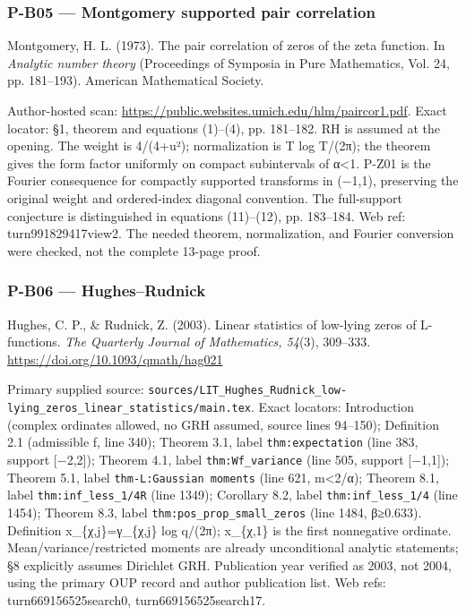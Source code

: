 \documentclass[11pt,a4paper]{article}
\theoremstyle{definition}\newtheorem{definition}{Definition}
\begin{document}
\subsubsection{P-B05 --- Montgomery supported pair
correlation}\label{p-b05--montgomery-supported-pair-correlation}

Montgomery, H. L. (1973). The pair correlation of zeros of the zeta
function. In \emph{Analytic number theory} (Proceedings of Symposia in
Pure Mathematics, Vol. 24, pp. 181--193). American Mathematical Society.

Author-hosted scan:
\url{https://public.websites.umich.edu/hlm/paircor1.pdf}. Exact locator:
§1, theorem and equations (1)--(4), pp. 181--182. RH is assumed at the
opening. The weight is 4/(4+u²); normalization is T log T/(2π); the
theorem gives the form factor uniformly on compact subintervals of
\textbar α\textbar\textless1. P-Z01 is the Fourier consequence for
compactly supported transforms in (−1,1), preserving the original weight
and ordered-index diagonal convention. The full-support conjecture is
distinguished in equations (11)--(12), pp. 183--184. Web ref:
turn991829417view2. The needed theorem, normalization, and Fourier
conversion were checked, not the complete 13-page proof.

\subsubsection{P-B06 --- Hughes--Rudnick}\label{p-b06--hughesrudnick}

Hughes, C. P., \& Rudnick, Z. (2003). Linear statistics of low-lying
zeros of L-functions. \emph{The Quarterly Journal of Mathematics,
54}(3), 309--333. \url{https://doi.org/10.1093/qmath/hag021}

Primary supplied source:
\texttt{sources/LIT\_Hughes\_Rudnick\_low-lying\_zeros\_linear\_statistics/main.tex}.
Exact locators: Introduction (complex ordinates allowed, no GRH assumed,
source lines 94--150); Definition 2.1 (admissible f, line 340); Theorem
3.1, label \texttt{thm:expectation} (line 383, support {[}−2,2{]});
Theorem 4.1, label \texttt{thm:Wf\_variance} (line 505, support
{[}−1,1{]}); Theorem 5.1, label \texttt{thm-L:Gaussian\ moments} (line
621, m\textless2/α); Theorem 8.1, label \texttt{thm:inf\_less\_1/4R}
(line 1349); Corollary 8.2, label \texttt{thm:inf\_less\_1/4} (line
1454); Theorem 8.3, label \texttt{thm:pos\_prop\_small\_zeros} (line
1484, β≥0.633). Definition x\_\{χ,j\}=γ\_\{χ,j\} log q/(2π); x\_\{χ,1\}
is the first nonnegative ordinate. Mean/variance/restricted moments are
already unconditional analytic statements; §8 explicitly assumes
Dirichlet GRH. Publication year verified as 2003, not 2004, using the
primary OUP record and author publication list. Web refs:
turn669156525search0, turn669156525search17.
\end{document}
